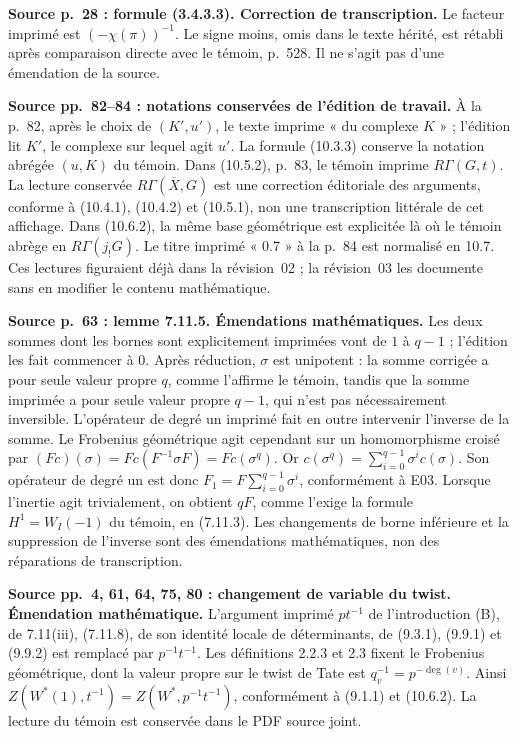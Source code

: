 \documentclass[10pt,letterpaper]{article}
\begin{document}
\begin{description}[style=nextline,leftmargin=2.6em,labelwidth=2.2em,font=\normalfont\bfseries]
\item[E16] \textbf{Source p.~28 : formule (3.4.3.3). Correction de transcription.} Le facteur imprimé est \((-\chi(\pi))^{-1}\). Le signe moins, omis dans le texte hérité, est rétabli après comparaison directe avec le témoin, p.~528. Il ne s'agit pas d'une émendation de la source.
\item[E17] \textbf{Source pp.~82--84 : notations conservées de l'édition de travail.} À la p.~82, après le choix de \((K',u')\), le texte imprime « du complexe \(K\) » ; l'édition lit \(K'\), le complexe sur lequel agit \(u'\). La formule (10.3.3) conserve la notation abrégée \((u,K)\) du témoin. Dans (10.5.2), p.~83, le témoin imprime \(R\Gamma(G,t)\). La lecture conservée \(R\Gamma(\overline X,G)\) est une correction éditoriale des arguments, conforme à (10.4.1), (10.4.2) et (10.5.1), non une transcription littérale de cet affichage. Dans (10.6.2), la même base géométrique est explicitée là où le témoin abrège en \(R\Gamma(j_!G)\). Le titre imprimé « 0.7 » à la p.~84 est normalisé en 10.7. Ces lectures figuraient déjà dans la révision~02 ; la révision~03 les documente sans en modifier le contenu mathématique.
\item[E18] \textbf{Source p.~63 : lemme 7.11.5. Émendations mathématiques.} Les deux sommes dont les bornes sont explicitement imprimées vont de \(1\) à \(q-1\) ; l'édition les fait commencer à \(0\). Après réduction, \(\sigma\) est unipotent : la somme corrigée a pour seule valeur propre \(q\), comme l'affirme le témoin, tandis que la somme imprimée a pour seule valeur propre \(q-1\), qui n'est pas nécessairement inversible. L'opérateur de degré un imprimé fait en outre intervenir l'inverse de la somme. Le Frobenius géométrique agit cependant sur un homomorphisme croisé par \((Fc)(\sigma)=F c(F^{-1}\sigma F)=F c(\sigma^q)\). Or \(c(\sigma^q)=\sum_{i=0}^{q-1}\sigma^i c(\sigma)\). Son opérateur de degré un est donc \(F_1=F\sum_{i=0}^{q-1}\sigma^i\), conformément à E03. Lorsque l'inertie agit trivialement, on obtient \(qF\), comme l'exige la formule \(H^1=W_I(-1)\) du témoin, en (7.11.3). Les changements de borne inférieure et la suppression de l'inverse sont des émendations mathématiques, non des réparations de transcription.

\item[E19] \textbf{Source pp.~4, 61, 64, 75, 80 : changement de variable du twist. Émendation mathématique.} L'argument imprimé \(pt^{-1}\) de l'introduction (B), de 7.11(iii), (7.11.8), de son identité locale de déterminants, de (9.3.1), (9.9.1) et (9.9.2) est remplacé par \(p^{-1}t^{-1}\). Les définitions 2.2.3 et 2.3 fixent le Frobenius géométrique, dont la valeur propre sur le twist de Tate est \(q_v^{-1}=p^{-\deg(v)}\). Ainsi \(Z(W^*(1),t^{-1})=Z(W^*,p^{-1}t^{-1})\), conformément à (9.1.1) et (10.6.2). La lecture du témoin est conservée dans le PDF source joint.


\end{description}
\end{document}
